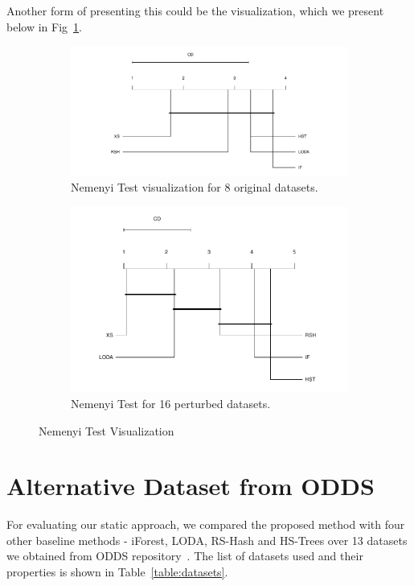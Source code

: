\documentclass[11pt,onecolumn]{article}
\begin{document}
Another form of presenting this could be the visualization, which we present below in Fig~\ref{fig:Nemenyi}.

\begin{figure}[ht!]
    \centering
    \begin{subfigure}[t]{0.49\textwidth}
        \centering
        \includegraphics[width=\linewidth]{fig/Nemenyi_Overall.pdf}
        \caption{Nemenyi Test visualization for 8 original datasets.}
    \end{subfigure}
    \hfill
    \begin{subfigure}[t]{0.49\textwidth}
        \centering
        \includegraphics[width=\linewidth]{fig/Nemenyi_LowDim.pdf}
        \caption{Nemenyi Test for 16 perturbed datasets.}
    \end{subfigure}
		\hfill
    \caption{Nemenyi Test Visualization}
    \label{fig:Nemenyi}
\end{figure}


\section{Alternative Dataset from ODDS}
For evaluating our static approach, we compared the proposed method with four other baseline methods - iForest, LODA, RS-Hash and HS-Trees over 13 datasets we obtained from ODDS repository~\cite{ODDS}.
The list of datasets used and their properties is shown in Table~\ref{table:datasets}.
\end{document}
